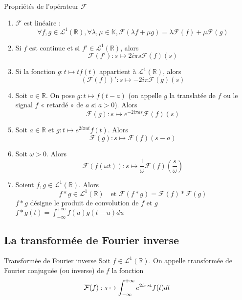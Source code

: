     \begin{prop}{Propriétés de l’opérateur $\mathcal{F}$}{}
        \begin{enumerate}
            \item $\mathcal{F}$ est linéaire :
            \[ \forall f,g \in \mathcal{L}^1(\mathbb{R}), \forall \lambda,\mu \in \mathbb{K}, \mathcal{F}(\lambda f + \mu g) = \lambda \mathcal{F}(f) + \mu \mathcal{F}(g) \] 
            \item Si $f$ est continue et si $f' \in \mathcal{L}^1(\mathbb{R})$, alors
            \[ \mathcal{F}(f') : s \mapsto 2 i \pi s \mathcal{F}(f)(s) \] 
            \item Si la fonction $g : t \mapsto t f(t)$ appartient à $\mathcal{L}^1(\mathbb{R})$, alors 
            \[ \left(\mathcal{F}(f)\right)' : s \mapsto -2i\pi \mathcal{F}(g)(s) \] 
            \item Soit $a \in \mathbb{R}$. On pose $g : t \mapsto f(t-a)$ (on appelle $g$ la translatée de $f$ ou le signal $f$ « retardé » de $a$ si $a > 0$). Alors
            \[ \mathcal{F}(g) : s \mapsto e^{-2i\pi a s} \mathcal{F}(f)(s) \] 
            \item Soit $a \in \mathbb{R}$ et $g : t \mapsto e^{2i \pi a t}f(t)$. Alors 
            \[ \mathcal{F}(g) : s \mapsto \mathcal{F}(f)(s-a) \]
            \item Soit $\omega > 0$. Alors
            \[ \mathcal{F}(f(\omega t)) : s \mapsto \frac{1}{\omega} \mathcal{F}(f)\left(\frac{s}{\omega}\right) \] 
            \item Soient $f,g \in \mathcal{L}^1(\mathbb{R})$. Alors
            \[ f * g \in \mathcal{L}^1(\mathbb{R}) \quad \text{et } \mathcal{F}(f * g) = \mathcal{F}(f) * \mathcal{F}(g) \]  
            $ f * g $ désigne le produit de convolution de $f$ et $g$ $f * g(t) = \int_{-\infty}^{+\infty} f(u)g(t-u)du$
        \end{enumerate}
    \end{prop}

\subsection{La transformée de Fourier inverse}

    \begin{defi}{Transformée de Fourier inverse}{}
        Soit $f \in \mathcal{L}^1(\mathbb{R})$. On appelle transformée de Fourier conjuguée (ou inverse) de $f$ la fonction 
        \[ \overline{\mathcal{F}}(f) : s \mapsto \int_{-\infty}^{+\infty} e^{2 i \pi st}f(t)dt \] 
    \end{defi}

